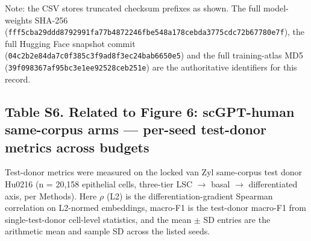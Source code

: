 \documentclass[12pt,a4paper]{article}
\begin{document}
\begingroup
\small
\centering
{}
\endgroup

Note: the CSV stores truncated checksum prefixes as shown. The full model-weights SHA-256 (\texttt{fff5cba29ddd8792991fa77b4872246fbe548a178cebda3775cdc72b67780e7f}), the full Hugging Face snapshot commit (\texttt{04c2b2e84da7c0f385c3f9ad8f3ec24bab6650e5}) and the full training-atlas MD5 (\texttt{39f098367af95bc3e1ee92528ceb251e}) are the authoritative identifiers for this record.

\needspace{45mm}
\subsection*{Table S6. Related to Figure 6: scGPT-human same-corpus arms --- per-seed test-donor metrics across budgets}
\label{tab:S6}

Test-donor metrics were measured on the locked van Zyl same-corpus test donor Hu0216 (n = 20,158 epithelial cells, three-tier LSC $\rightarrow$ basal $\rightarrow$ differentiated axis, per Methods). Here $\rho$ (L2) is the differentiation-gradient Spearman correlation on L2-normed embeddings, macro-F1 is the test-donor macro-F1 from single-test-donor cell-level statistics, and the mean $\pm$ SD entries are the arithmetic mean and sample SD across the listed seeds.
\end{document}
